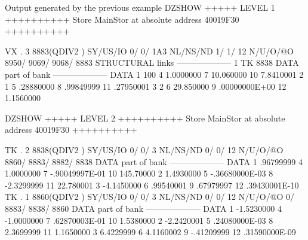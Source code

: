 \begin{landscapebody}
\begin{XMPt}{Output generated by the previous example}
DZSHOW  +++++ LEVEL     1 ++++++++++            Store  MainStor at absolute address 40019F30      ++++++++++                     
                                                                                                                                 
 VX  .     3     8883(QDIV2   ) SY/US/IO    0/    0/ 1A3 NL/NS/ND    1/    1/      12 N/U/O/@O    8950/    9069/    9068/    8883
STRUCTURAL links                                          --------------------                                                   
          1    TK        8838                                                                                                    
DATA part of bank                                         --------------------                                                   
DATA      1               100     4     1.0000000         7     10.060000        10     7.8410001                                
          2                 1     5     .28880000         8     .99849999        11     .27950001                                
          3                 2     6     29.850000         9     .00000000E+00    12     1.1560000                                
                                                                                                                                 
DZSHOW  +++++ LEVEL     2 ++++++++++            Store  MainStor at absolute address 40019F30      ++++++++++                     
                                                                                                                                 
 TK  .     2     8838(QDIV2   ) SY/US/IO    0/    0/   3 NL/NS/ND    0/    0/      12 N/U/O/@O    8860/    8883/    8882/    8838
DATA part of bank                                         --------------------                                                   
DATA      1     .96799999         4     1.0000000         7    -.90049997E-01    10     145.70000                                
          2     1.4930000         5    -.36680000E-03     8    -2.3299999        11     22.780001                                
          3    -4.1450000         6     .99540001         9     .67979997        12     .39430001E-10                            
 TK  .     1     8860(QDIV2   ) SY/US/IO    0/    0/   3 NL/NS/ND    0/    0/      12 N/U/O/@O       0/    8883/    8838/    8860
DATA part of bank                                         --------------------                                                   
DATA      1    -1.5230000         4    -1.0000000         7     .62870003E-01    10     1.5380000                                
          2    -2.2420001         5     .24080000E-03     8     2.3699999        11     1.1650000                                
          3     6.4229999         6     4.1160002         9    -.41209999        12     .31590000E-09                            
                                                                                                                                 

\end{XMPt}
\end{landscapebody}
